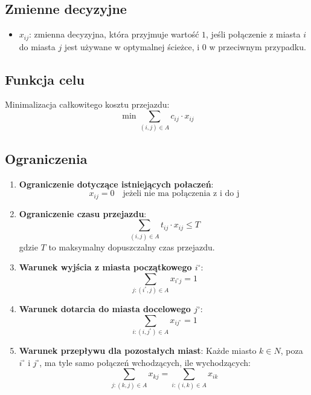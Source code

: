 \documentclass[12pt, letterpaper]{article}
\begin{document}
\subsection*{Zmienne decyzyjne}
\begin{itemize}
  \item \( x_{ij} \): zmienna decyzyjna, która przyjmuje wartość \( 1 \),
        jeśli połączenie z miasta \( i \) do miasta \( j \) jest używane w
        optymalnej
        ścieżce, i \( 0 \) w przeciwnym przypadku.
\end{itemize}

\subsection*{Funkcja celu}
Minimalizacja całkowitego kosztu przejazdu:
\[
  \min \sum_{(i, j) \in A} c_{ij} \cdot x_{ij}
\]

\subsection*{Ograniczenia}
\begin{enumerate}
  \item \textbf{Ograniczenie dotyczące istniejących połaczeń}:
        \[
          x_{ij} = 0 \quad \text{jeżeli nie ma połączenia z i do j}
        \]
  \item \textbf{Ograniczenie czasu przejazdu}:
        \[
          \sum_{(i, j) \in A} t_{ij} \cdot x_{ij} \leq T
        \]
        gdzie \( T \) to maksymalny dopuszczalny czas przejazdu.

  \item \textbf{Warunek wyjścia z miasta początkowego \( i^\circ \)}:
        \[
          \sum_{j : (i^\circ, j) \in A} x_{i^\circ j} = 1
        \]

  \item \textbf{Warunek dotarcia do miasta docelowego \( j^\circ \)}:
        \[
          \sum_{i : (i, j^\circ) \in A} x_{ij^\circ} = 1
        \]

  \item \textbf{Warunek przepływu dla pozostałych miast}:
        Każde miasto \( k \in N \), poza \( i^\circ \) i \( j^\circ \), ma tyle
        samo połączeń wchodzących, ile wychodzących:
        \[
          \sum_{j : (k, j) \in A} x_{kj} = \sum_{i : (i, k) \in A} x_{ik}
        \]
\end{enumerate}
\end{document}
